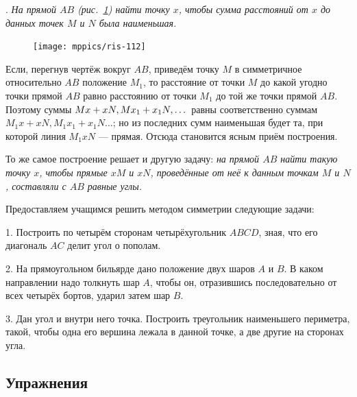 \documentclass[oneside]{book}
\begin{document}
\smallskip
{}.
\emph{На прямой $AB$ \emph{(рис.~\ref{1938/ris-112})} найти точку $x$, чтобы сумма расстояний от $x$ до данных точек $M$ и $N$ была наименьшая.}

\begin{figure}
\centering
\texttt{[image: mppics/ris-112]}
\caption{}\label{1938/ris-112}
\end{figure}

Если, перегнув чертёж вокруг $AB$, приведём точку $M$ в симметричное относительно $AB$ положение $M_1$, то расстояние от точки $M$ до какой угодно точки прямой $AB$ равно расстоянию от точки $M_1$ до той же точки прямой $AB$.
Поэтому суммы $Mx+xN,  Mx_1\z+x_1N,\dots $ равны соответственно суммам $M_1x+xN, M_1x_1+x_1N \dots$;
но из последних сумм наименьшая будет та, при которой линия $M_1xN$ — прямая.
Отсюда становится ясным приём построения.

То же самое построение решает и другую задачу:
\emph{на прямой $AB$ найти такую точку $x$, чтобы прямые $xM$ и $xN$, проведённые от неё к данным точкам $M$ и $N$, составляли с $AB$ равные углы.}

Предоставляем учащимся решить методом симметрии следующие задачи:

\medskip

1.
Построить по четырём сторонам четырёхугольник $ABCD$, зная, что его диагональ $AC$ делит угол о пополам.

2.
На прямоугольном бильярде дано положение двух шаров $A$ и $B$.
В каком направлении надо толкнуть шар $A$, чтобы он, отразившись последовательно от всех четырёх бортов, ударил затем шар $B$.

3.
Дан угол и внутри него точка.
Построить треугольник наименьшего периметра, такой, чтобы одна его вершина лежала в данной точке, а две другие на сторонах угла.

\subsection*{Упражнения}


\begin{center}
\end{center}
\end{document}
